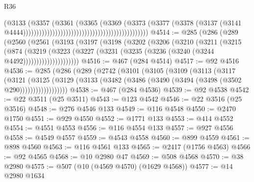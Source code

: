 \begin{lexlean}{R36}
\begin{coremodule}
                                                                              (@3133
                                                                                (@3357
                                                                                  (@3361
                                                                                    (@3365
                                                                                      (@3369
                                                                                        (@3373
                                                                                          (@3377
                                                                                            (@3378
                                                                                              (@3137
                                                                                                (@3141
                                                                                                  @4444)))))))))))))))))))))))))))))))))))))))))))))))
@4514 := @285
    (@286
      (@289
        (@2560
          (@2561
            (@3193
              (@3197
                (@3198
                  (@3202
                    (@3206
                      (@3210
                        (@3211
                          (@3215
                            (@874
                              (@3219
                                (@3223
                                  (@3227
                                    (@3231 (@3235 (@3236 (@3240 (@3244 @4492)))))))))))))))))))))
@4516 := @467 (@284 @4514)
@4517 := @92 @4516
@4536 := @285
    (@286
      (@289
        (@2742
          (@3101
            (@3105
              (@3109
                (@3113
                  (@3117
                    (@3121
                      (@3125
                        (@3129
                          (@3133 (@3482 (@3486 (@3490 (@3494 (@3498 (@3502 @290))))))))))))))))))
@4538 := @467 (@284 @4536)
@4539 := @92 @4538
@4542 := @22 @3511 (@25 @3511)
@4543 := @123 @4542
@4546 := @22 @3516 (@25 @3516)
@4548 := @276 @4546 @133
@4549 := @116 @4548
@4550 := @2470 @1750
@4551 := @929 @4550
@4552 := @1771 @133
@4553 := @414 @4552
@4554 := @4551 @4553
@4556 := @116 @4554 @133
@4557 := @927 @4556
@4558 := @4549 @4557
@4559 := @4543 @4558
@4560 := @899 @4559
@4561 := @898 @4560
@4563 := @116 @4561 @133
@4565 := @2417 (@1756 @4563)
@4566 := @92 @4565
@4568 := @10 @2980 @47
@4569 := @508 @4568
@4570 := @38 @2980
@4575 := @507 (@10 (@4569 @4570) (@1629 @4568))
@4577 := @14 @2980 @1634

\end{coremodule}
\end{lexlean}
